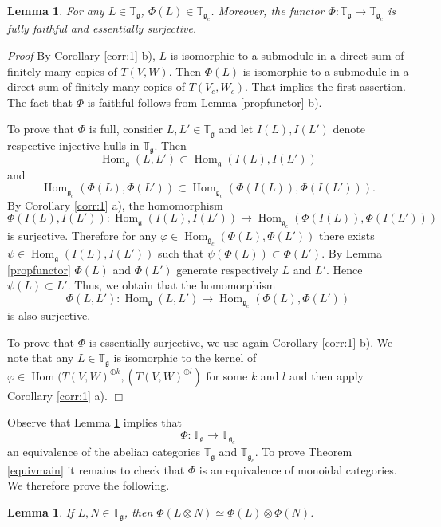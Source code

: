 \documentclass{svmult}
\newtheorem{lem}[theo]{Lemma}
\renewenvironment{proof}{ \emph{Proof}}{$\Box$}
\newcommand{\TT}{\mathbb{T}}
\renewcommand{\gg}{\mathfrak{g}}
\begin{document}
\begin{lem}\label{functor} For any $L\in \TT_\gg$, $\Phi(L)\in  \TT_{\gg_c}$. Moreover,
the functor $\Phi: \TT_\gg\to\TT_{\gg_c}$ is fully faithful and essentially surjective.
\end{lem}
\begin{proof} By Corollary \ref{corr:1} b), $L$ is isomorphic to a submodule in a direct sum of finitely many copies of
$T(V,W)$. Then $\Phi(L)$ is isomorphic to a submodule in  a direct sum of finitely
many copies of $T(V_c,W_c)$. That implies the first assertion. The
fact that $\Phi$ is faithful follows from Lemma \ref{propfunctor}
b). 

To prove that $\Phi$ is full, consider $L,L'\in  \TT_\gg$ and let
$I(L),I(L')$ denote respective injective hulls in $\TT_\gg$. Then 
$$\operatorname{Hom}_\gg(L,L')\subset\operatorname{Hom}_\gg(I(L),I(L'))$$ and 
$$\operatorname{Hom}_{\gg_c}(\Phi(L),\Phi(L'))\subset\operatorname{Hom}_{\gg_c}(\Phi(I(L)),\Phi(I(L'))).$$ By
Corollary \ref{corr:1} a), the homomorphism
$$\Phi(I(L),I(L')):\operatorname{Hom}_\gg(I(L),I(L'))\to\operatorname{Hom}_{\gg_c}(\Phi(I(L)),\Phi(I(L')))$$ 
is surjective. Therefore for any $\varphi\in \operatorname{Hom}_{\gg_c}(\Phi(L),\Phi(L'))$ there exists 
$\psi\in \operatorname{Hom}_\gg(I(L),I(L'))$ such that $\psi(\Phi(L))\subset \Phi(L')$. By Lemma \ref{propfunctor}  
$\Phi(L)$ and $\Phi(L')$ generate respectively
$L$ and $L'$. Hence $\psi(L)\subset L'$. Thus, we obtain that
the homomorphism 
$$\Phi(L,L'):\operatorname{Hom}_\gg(L,L')\to\operatorname{Hom}_{\gg_c}(\Phi(L),\Phi(L'))$$ is also surjective. 

To prove that $\Phi$ is essentially surjective, we use again
Corollary \ref{corr:1} b). We note that any $L\in  \TT_\gg$ is
isomorphic to the kernel of $\varphi\in\operatorname{Hom}(T(V,W)^{\oplus k},(T(V,W)^{\oplus l})$
for some $k$ and $l$ and then apply Corollary \ref{corr:1} a).
\end{proof}

Observe that Lemma \ref{functor} implies that $$\Phi:\TT_\gg \rightarrow \TT_{\gg_c}$$ an equivalence of the abelian
categories $\TT_\gg$ and $\TT_{\gg_c}$.
To prove Theorem \ref{equivmain} it remains 
to check that $\Phi$ is an equivalence of monoidal categories. We therefore prove the following.

\begin{lem}\label{tensphi} If $L,N\in\TT_{\gg}$, then $\Phi(L\otimes N)\simeq \Phi(L)\otimes \Phi(N)$.
\end{lem}
\end{document}
